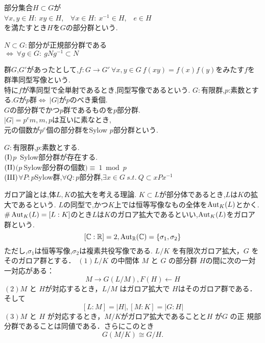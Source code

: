 部分集合$H\subset G$が\\
$\forall x,y \in H: \ xy\in H$,\ \ $\forall x\in H:\ x^{-1} \in H$,\ \ $e\in H$\\
を満たすとき$H$を$G$の部分群という.


$N\subset G:$部分が正規部分群である\\
$\iff \ \forall g\in G : \ gNg^{-1} \subset N$

群$G$,$G'$があったとして,$f:G\to G' \  \forall x,y \in G \ f(xy)=f(x)f(y)$をみたす$f$を群準同型写像という.\\
特に$f$が準同型で全単射であるとき,同型写像であるという.
{}
$G:$有限群,$p$:素数とする.$G$が$p$群$\iff\ |G|$が$p$のべき乗個.\\
$G$の部分群でかつ$p$群であるものを$p$部分群.\\
$|G|=p^e m, m,p$は互いに素なとき,\\
元の個数が$p^e$個の部分群をSylow $p$部分群という.

\thm[Sylowの定理]
$G:$有限群,$p$:素数とする.\\
$\rm (I)$$p$\ Sylow部分群が存在する.\\
$\rm (II)$$(p\ $Sylow部分群の個数$)\equiv\ 1 \bmod p$\\
$\rm (III)$$\forall P:p$Sylow群,$\forall Q:p$部分群,$\exists x\in G\  s.t. \ Q\subset xPx^{-1}$
\thmx


ガロア論とは,体$L,K$の拡大を考える理論.
$K \subset L$が部分体であるとき,$L$は$K$の拡大であるという.
{}
$L$の同型で,かつ$K$上では恒等写像なもの全体を$\mathop{\mathrm{Aut}}\nolimits_K(L)$とかく.
$\# \mathop{\mathrm{Aut}}\nolimits_K(L)=[L:K]$のとき$L$は$K$のガロア拡大であるといい,$\mathop{\mathrm{Aut}}\nolimits_K(L)$をガロア群という.
\ex
\[
[\mathbb C:\mathbb R]=2,\mathop{\mathrm{Aut}}\nolimits_\mathbb R(\mathbb C) = \{\sigma_1,\sigma_2\}
\]
ただし,$\sigma_1$は恒等写像,$\sigma_2$は複素共役写像である.
\exx
\thm
$L/K$ を有限次ガロア拡大，$G$ をそのガロア群とする．
$(1)L/K$ の中間体 $M$ と $G$ の部分群 $H$の間に次の一対一対応がある：
\[
M \rightarrow G(L/M) , F(H) \leftarrow H
\]
$(2) M$ と $H $が対応するとき，$L/M$ はガロア拡大で $H$はそのガロア群である．
そして
\[
[L : M] = |H|, [M : K] = |G : H|
\]
$(3) M$ と $H$ が対応するとき，$M/K$がガロア拡大であることと$H$ が$G$ の正
規部分群であることは同値である．さらにこのとき
\[
G(M/K) \cong G/H. 
\]
\thmx

